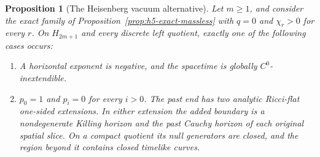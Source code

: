 \documentclass[10pt,a4paper]{article}
\numberwithin{equation}{section}
\newtheorem{proposition}[theorem]{Proposition}
\theoremstyle{definition}
\theoremstyle{remark}
\begin{document}
\begin{proposition}[The Heisenberg vacuum alternative]
\label{prop:heisenberg-vacuum-dichotomy}
Let $m\ge1$, and consider the exact family of
Proposition~\ref{prop:h5-exact-massless} with $q=0$ and
$\chi_r>0$ for every $r$.  On $H_{2m+1}$ and every discrete left quotient,
exactly one of the following cases occurs:
\begin{enumerate}[label=\textup{(\roman*)}]
\item A horizontal exponent is negative, and the spacetime is globally
$C^0$-inextendible.
\item $p_0=1$ and $p_i=0$ for every $i>0$.  The past end has two analytic
Ricci-flat one-sided extensions.  In either extension the added boundary
is a nondegenerate Killing horizon and the past Cauchy horizon of each
original spatial slice.  On a compact quotient its null generators are
closed, and the region beyond it contains closed timelike curves.
\end{enumerate}
\end{proposition}
\end{document}
